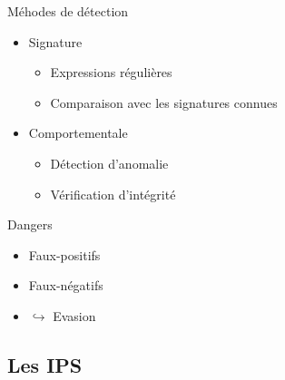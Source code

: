 \documentclass{beamer}
\begin{document}
{\framebreak

\begin{block}{Méhodes de détection}
\begin{itemize}
\item Signature
    \begin{itemize}
        \item Expressions régulières
        \item Comparaison avec les signatures connues
    \end{itemize}
\item Comportementale
    \begin{itemize}
        \item Détection d'anomalie
        \item Vérification d'intégrité
    \end{itemize}
\end{itemize}
\end{block}

\begin{alertblock}{Dangers}
\begin{itemize}
\item Faux-positifs
\item Faux-négatifs
\item[] $\hookrightarrow$ Evasion
\end{itemize}
\end{alertblock}

}

\subsection{Les IPS}



\end{document}
